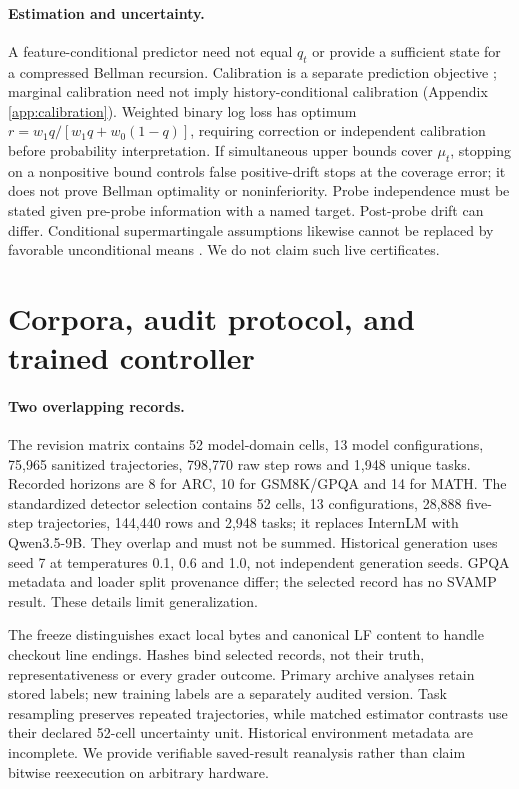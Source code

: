 \documentclass{article}
\begin{document}
\paragraph{Estimation and uncertainty.}
A feature-conditional predictor need not equal \(q_t\) or provide a sufficient
state for a compressed Bellman recursion. Calibration is a separate prediction
objective \citep{guo2017}; marginal calibration need not imply history-conditional
calibration (Appendix \ref{app:calibration}). Weighted binary log loss
has optimum \(r=w_1q/[w_1q+w_0(1-q)]\), requiring correction or independent
calibration before probability interpretation. If simultaneous upper bounds
cover \(\mu_t\), stopping on a nonpositive bound controls false positive-drift
stops at the coverage error; it does not prove Bellman optimality or
noninferiority. Probe independence must be stated given pre-probe information
with a named target. Post-probe drift can differ. Conditional supermartingale
assumptions likewise cannot be replaced by favorable unconditional means
\citep{hoeffding1963,howard2021}. We do not claim such live certificates.

\section{Corpora, audit protocol, and trained controller}
\label{sec:methods}
\paragraph{Two overlapping records.}
The revision matrix contains 52 model-domain cells, 13 model configurations,
75,965 sanitized trajectories, 798,770 raw step rows and 1,948 unique tasks.
Recorded horizons are 8 for ARC, 10 for GSM8K/GPQA and 14 for MATH. The
standardized detector selection contains 52 cells, 13 configurations,
28,888 five-step trajectories, 144,440 rows and 2,948 tasks; it replaces
InternLM with Qwen3.5-9B. They overlap and must not be summed. Historical
generation uses seed 7 at temperatures 0.1, 0.6 and 1.0, not independent
generation seeds. GPQA metadata and loader split provenance differ; the
selected record has no SVAMP result. These details limit generalization.

The freeze distinguishes exact local bytes and canonical LF content to handle
checkout line endings. Hashes bind selected records, not their truth,
representativeness or every grader outcome. Primary archive analyses retain
stored labels; new training labels are a separately audited version. Task
resampling preserves repeated trajectories, while matched estimator
contrasts use their declared 52-cell uncertainty unit. Historical environment
metadata are incomplete. We provide verifiable saved-result reanalysis rather
than claim bitwise reexecution on arbitrary hardware.
\end{document}
